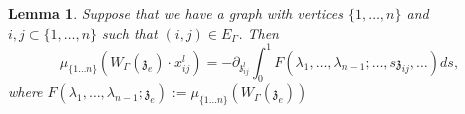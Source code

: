 \documentclass[11pt]{amsart}
\newtheorem{lem}[thm]{Lemma}
\theoremstyle{definition}
\theoremstyle{remark}
\numberwithin{equation}{section}
\begin{document}
\begin{lem}\label{IntegralR}
  Suppose that we have a graph with vertices $\{1,\dots,n\}$ and $i,j\subset \{1,\dots,n\}$ such that $(i,j)\in E_{\Gamma}$. Then
  $$
  \mu_{\{1\dots n\}}\left(W_{\Gamma}(\mathfrak{z}_{e})\cdot x^l_{ij}\right)=-\partial_{\mathfrak{z}^l_{ij}}\int^1_0F(\lambda_1,\dots,\lambda_{n-1};\dots,s\mathfrak{z}_{ij},\dots)ds,
  $$
  where $F(\lambda_1,\dots,\lambda_{n-1};\mathfrak{z}_e):=\mu_{\{1\dots n\}}\left(W_{\Gamma}(\mathfrak{z}_{e})\right)$
\end{lem}
\begin{figure}[htp]
  \centering



\begin{tikzpicture}[x=0.75pt,y=0.75pt,yscale=-1,xscale=1]


\end{tikzpicture}
\end{figure}
\end{document}
